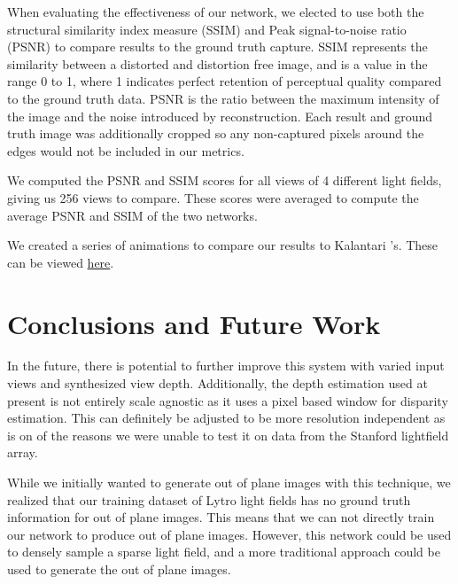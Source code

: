 \documentclass[10pt,twocolumn,letterpaper]{article}
\begin{document}
When evaluating the effectiveness of our network, we elected to use both the structural similarity index measure (SSIM)
and Peak signal-to-noise ratio (PSNR) to compare results to the ground truth capture. SSIM represents the similarity
between a distorted and distortion free image, and is a value in the range 0 to 1, where 1 indicates perfect retention
of perceptual quality compared to the ground truth data. PSNR is the ratio between the maximum intensity of the image
and the noise introduced by reconstruction. Each result and ground truth image was additionally cropped so any
non-captured pixels around the edges would not be included in our metrics.

We computed the PSNR and SSIM scores for all views of 4 different light fields, giving us 256 views to compare.
These scores were averaged to compute the average PSNR and SSIM of the two networks. 


We created a series of animations to compare our results to Kalantari \etal's. These can be viewed 
\href{https://drive.google.com/drive/folders/1DDbB1v1vbq7zsg3srJPDKFlI9H7mGEmC?usp=sharing}{here}.

\section{Conclusions and Future Work}

In the future, there is potential to further improve this system with varied input views and synthesized
view depth. Additionally, the depth estimation used at present is not entirely scale agnostic as it
uses a pixel based window for disparity estimation. This can definitely be adjusted to be more resolution
independent as is on of the reasons we were unable to test it on data from the Stanford lightfield array.

While we initially wanted to generate out of plane images with this technique, we realized that our training dataset
of Lytro light fields has no ground truth information for out of plane images. This means that we can not directly
train our network to produce out of plane images. However, this network could be used to densely sample a sparse light field,
and a more traditional approach could be used to generate the out of plane images.


{\small


}
\end{document}
